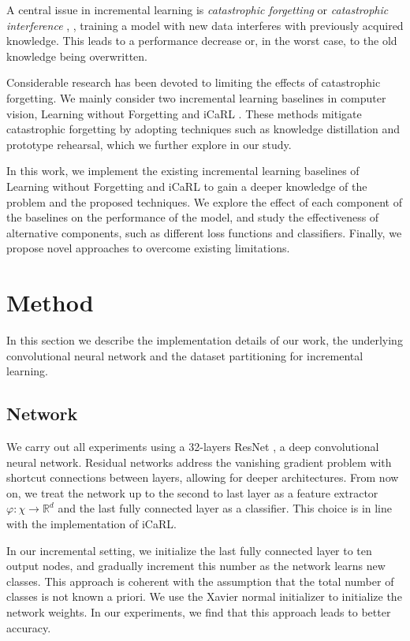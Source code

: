 \documentclass[10pt,twocolumn,letterpaper]{article}
\begin{document}
A central issue in incremental learning is \emph{catastrophic forgetting} or \emph{catastrophic interference} \cite{parisi:2019}, \ie, training a model with new data interferes with previously acquired knowledge. This leads to a performance decrease or, in the worst case, to the old knowledge being overwritten.

Considerable research has been devoted to limiting the effects of catastrophic forgetting. We mainly consider two incremental learning baselines in computer vision, Learning without Forgetting \cite{li:2016} and iCaRL \cite{rebuffi:2017}. These methods mitigate catastrophic forgetting by adopting techniques such as knowledge distillation and prototype rehearsal, which we further explore in our study.

In this work, we implement the existing incremental learning baselines of Learning without Forgetting and iCaRL to gain a deeper knowledge of the problem and the proposed techniques. We explore the effect of each component of the baselines on the performance of the model, and study the effectiveness of alternative components, such as different loss functions and classifiers. Finally, we propose novel approaches to overcome existing limitations.

\section{Method}
In this section we describe the implementation details of our work, the underlying convolutional neural network and the dataset partitioning for incremental learning.

\subsection{Network}
We carry out all experiments using a 32-layers ResNet \cite{he:2016}, a deep convolutional neural network. Residual networks address the vanishing gradient problem with shortcut connections between layers, allowing for deeper architectures. From now on, we treat the  network up to the second to last layer as a feature extractor $\varphi: \chi \to \mathbb{R}^{d}$ and the last fully connected layer as a classifier. This choice is in line with the implementation of iCaRL.

In our incremental setting, we initialize the last fully connected layer to ten output nodes, and gradually increment this number as the network learns new classes. This approach is coherent with the assumption that the total number of classes is not known a priori. We use the Xavier normal initializer \cite{glorot:2010} to initialize the network weights. In our experiments, we find that this approach leads to better accuracy.
\end{document}
